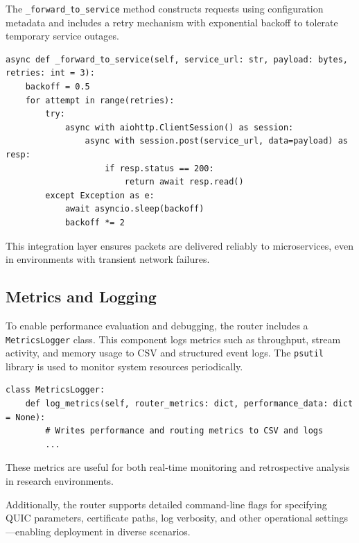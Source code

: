 The \texttt{\_forward\_to\_service} method constructs requests using configuration metadata and includes a retry mechanism with exponential backoff to tolerate temporary service outages.

\begin{lstlisting}[breaklines=true,basicstyle=\small\ttfamily,frame=single]
async def _forward_to_service(self, service_url: str, payload: bytes, retries: int = 3):
    backoff = 0.5
    for attempt in range(retries):
        try:
            async with aiohttp.ClientSession() as session:
                async with session.post(service_url, data=payload) as resp:
                    if resp.status == 200:
                        return await resp.read()
        except Exception as e:
            await asyncio.sleep(backoff)
            backoff *= 2
\end{lstlisting}

This integration layer ensures packets are delivered reliably to microservices, even in environments with transient network failures.

\subsection{Metrics and Logging}

To enable performance evaluation and debugging, the router includes a \texttt{MetricsLogger} class. This component logs metrics such as throughput, stream activity, and memory usage to CSV and structured event logs. The \texttt{psutil} library is used to monitor system resources periodically.

\begin{lstlisting}[breaklines=true,basicstyle=\small\ttfamily,frame=single]
class MetricsLogger:
    def log_metrics(self, router_metrics: dict, performance_data: dict = None):
        # Writes performance and routing metrics to CSV and logs
        ...
\end{lstlisting}

These metrics are useful for both real-time monitoring and retrospective analysis in research environments.

Additionally, the router supports detailed command-line flags for specifying QUIC parameters, certificate paths, log verbosity, and other operational settings—enabling deployment in diverse scenarios.


